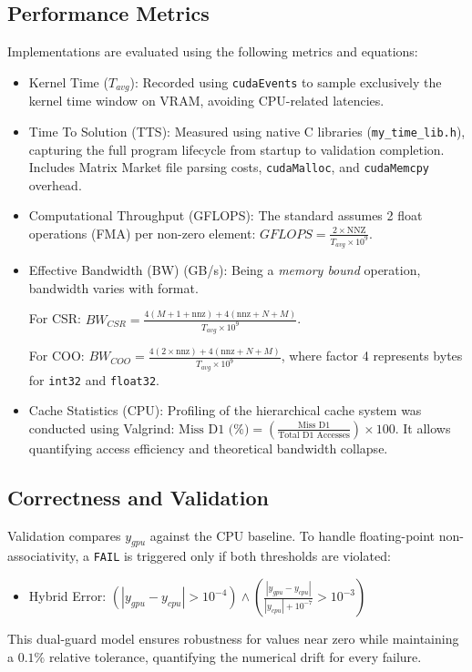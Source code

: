 \documentclass[conference]{IEEEtran}
\begin{document}
\subsection{Performance Metrics}Implementations are evaluated using the following metrics and equations:\begin{itemize} \itemsep0em\item Kernel Time ($T_{avg}$): Recorded using \texttt{cudaEvents} to sample exclusively the kernel time window on VRAM, avoiding CPU-related latencies.\item Time To Solution (TTS): Measured using native C libraries (\texttt{my\_time\_lib.h}), capturing the full program lifecycle from startup to validation completion. Includes Matrix Market file parsing costs, \texttt{cudaMalloc}, and \texttt{cudaMemcpy} overhead.


\item Computational Throughput (GFLOPS): The standard assumes 2 float operations (FMA) per non-zero element: $GFLOPS = \frac{2 \times \text{NNZ}}{T_{avg} \times 10^9}$.


\item Effective Bandwidth (BW) (GB/s): Being a \textit{memory bound} operation, bandwidth varies with format.

For CSR: $BW_{CSR} = \frac{4 (M + 1 + \text{nnz}) + 4 (\text{nnz} + N + M)}{T_{avg} \times 10^9}$.

For COO: $BW_{COO} = \frac{4 (2 \times \text{nnz}) + 4 (\text{nnz} + N + M)}{T_{avg} \times 10^9}$, where factor 4 represents bytes for \texttt{int32} and \texttt{float32}.


\item Cache Statistics (CPU): Profiling of the hierarchical cache system was conducted using Valgrind: $\text{Miss D1 (\%)} = \left( \frac{\text{Miss D1}}{\text{Total D1 Accesses}} \right) \times 100$. It allows quantifying access efficiency and theoretical bandwidth collapse.

\end{itemize}


\subsection{Correctness and Validation}Validation compares $y_{gpu}$ against the CPU baseline. To handle floating-point non-associativity, a \texttt{FAIL} is triggered only if both thresholds are violated:\begin{itemize} \itemsep0em\item Hybrid Error: $(|y_{gpu} - y_{cpu}| > 10^{-4}) \land \left( \frac{|y_{gpu} - y_{cpu}|}{|y_{cpu}| + 10^{-7}} > 10^{-3} \right)$\end{itemize}This dual-guard model ensures robustness for values near zero while maintaining a $0.1\%$ relative tolerance, quantifying the numerical drift for every failure.
\end{document}
